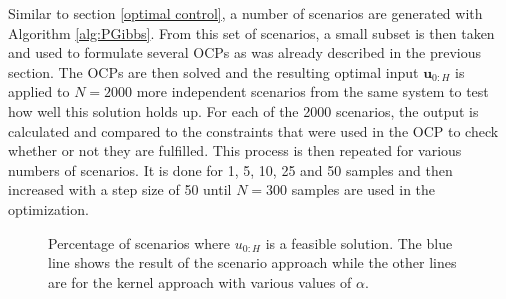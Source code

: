 Similar to section \ref{optimal control}, a number of scenarios are generated with Algorithm \ref{alg:PGibbs}. From this set of scenarios, a small subset is then taken and used to formulate several OCPs as was already described in the previous section. The OCPs are then solved and the resulting optimal input $\boldsymbol{u}_{0:H}$ is applied to $N = 2000$ more independent scenarios from the same system to test how well this solution holds up. For each of the 2000 scenarios, the output is calculated and compared to the constraints that were used in the OCP to check whether or not they are fulfilled. This process is then repeated for various numbers of scenarios. It is done for 1, 5, 10, 25 and 50 samples and then increased with a step size of 50 until $N = 300$ samples are used in the optimization.

\begin{figure}[t]
		\def\file{data/AlphaTest_K300_MaxConstraint_S2.txt}
		
		\centering
		\vspace*{-0.4cm}
		
		\caption{Percentage of scenarios where $u_{0:H}$ is a feasible solution. The blue line shows the result of the scenario approach while the other lines are for the kernel approach with various values of $\alpha$.}
		\label{fig:robustness_plot}
\end{figure}


